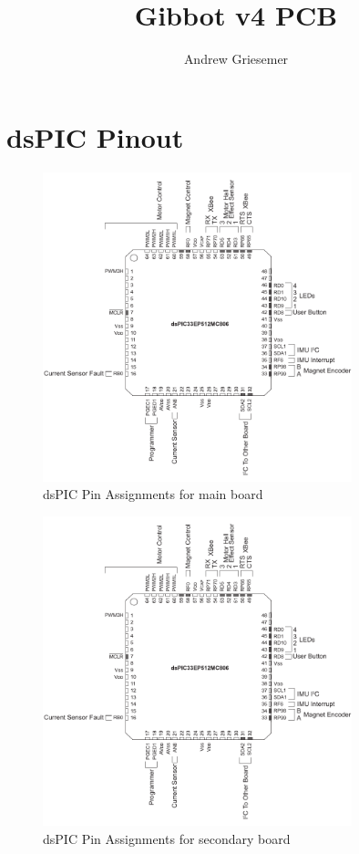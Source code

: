 \documentclass{article}
\begin{document}
\title{Gibbot v4 PCB}
\author{Andrew Griesemer}
\maketitle
\section{dsPIC Pinout}
\begin{figure}[h!]
	\centering
	\includegraphics[width=0.8\textwidth, page=1]{breakout}
	\caption{dsPIC Pin Assignments for main board}
	\label{pinout1}
\end{figure}
\begin{figure}[h!]
	\centering
	\includegraphics[width=0.8\textwidth, page=2]{breakout}
	\caption{dsPIC Pin Assignments for secondary board}
	\label{pinout2}
\end{figure}
\end{document}
